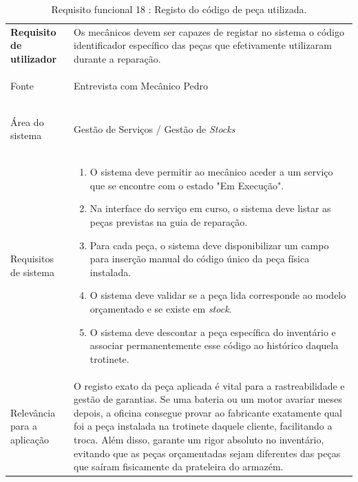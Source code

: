 \documentclass[a4paper,12pt]{scrreprt}
\begin{document}
\begin{table}[H]
    \centering
    \renewcommand{\arraystretch}{1.5} 
    
    \begin{tabular}{|>{\columncolor{gray!15}\bfseries}p{4cm}|p{10.5cm}|}
        \hline
        Requisito de utilizador & Os mecânicos devem ser capazes de registar no sistema o código identificador específico das peças que efetivamente utilizaram durante a reparação. \\ \hdashline
        
        Fonte & Entrevista com Mecânico Pedro \\ \hdashline
        
        Área do sistema & Gestão de Serviços / Gestão de \textit{Stocks}  \\ \hdashline
        
        Requisitos de sistema & 
        \begin{enumerate}[leftmargin=*, nosep, topsep=2pt, partopsep=0pt]
            \item O sistema deve permitir ao mecânico aceder a um serviço que se encontre com o estado "Em Execução".
            \item Na interface do serviço em curso, o sistema deve listar as peças previstas na guia de reparação.
            \item Para cada peça, o sistema deve disponibilizar um campo para inserção manual do código único da peça física instalada.
            \item O sistema deve validar se a peça lida corresponde ao modelo orçamentado e se existe em \textit{stock}.
            \item O sistema deve descontar a peça específica do inventário e associar permanentemente esse código ao histórico daquela trotinete.
        \end{enumerate} \\ \hdashline
        
        Relevância para a aplicação & O registo exato da peça aplicada é vital para a rastreabilidade e gestão de garantias. Se uma bateria ou um motor avariar meses depois, a oficina consegue provar ao fabricante exatamente qual foi a peça instalada na trotinete daquele cliente, facilitando a troca. Além disso, garante um rigor absoluto no inventário, evitando que as peças orçamentadas sejam diferentes das peças que saíram fisicamente da prateleira do armazém. \\ \hline
    \end{tabular}
    \caption{Requisito funcional 18 : Registo do código de peça utilizada.}
    \label{tab:rf_registar_codigo_peca}
\end{table}
\end{document}
